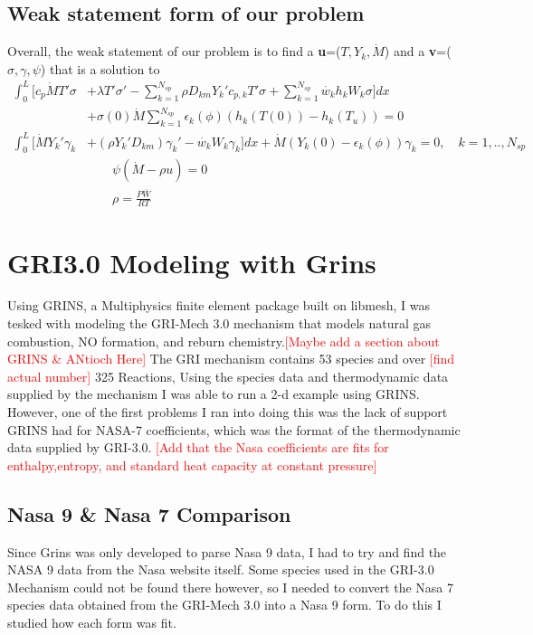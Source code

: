 \documentclass{article}
\newcommand\tab[1][1cm]{\hspace*{#1}}
\newcommand{\red}[1]{\textcolor{red}{[#1]}} %
\begin{document}
\subsection{Weak statement form of our problem}
  Overall, the weak statement of our problem is to find a \textbf{u}=($T,Y_{k},\dot{M}$) and a \textbf{v}=($\sigma,\gamma,\psi$) that is a solution to
  \begin{align*}
    \int_{0}^{L}[c_{p}\dot{M}T'\sigma&+\lambda T'\sigma '-\sum_{k=1}^{N_{sp}}\rho D_{km}Y_{k}'c_{p,k}T'\sigma+\sum_{k=1}^{N_{sp}}\dot{w_{k}}h_{k}W_{k}\sigma ]dx  \\
    &+ \sigma(0)\dot{M}\sum_{k=1}^{N_{sp}}\epsilon _{k}(\phi)(h_{k}(T(0))-h_{k}(T_{u})) = 0 \\
    \int_{0}^{L}[\dot{M}Y_{k}'\gamma_{k}&+(\rho Y_{k}'D_{km})\gamma_{k}'-\dot{w_{k}}W_{k}\gamma_{k}]dx + \dot{M}(Y_{k}(0)-\epsilon_{k}(\phi))\gamma_{k} = 0,\quad k=1,..,N_{sp} \\
   &\qquad \psi(\dot{M}-\rho u) = 0 \\
    &\qquad\rho = \frac{P\bar{W}}{RT} 
    \end{align*}






\newpage
\section{GRI3.0 Modeling with Grins}
\tab Using GRINS, a Multiphysics finite element package built on libmesh, I was tesked with modeling the GRI-Mech 3.0 mechanism that models natural gas combustion, NO formation, and reburn chemistry.\red{Maybe add a section about GRINS \& ANtioch Here} The GRI mechanism contains 53 species and over \red{find actual number} 325 Reactions, Using the species data and thermodynamic data supplied by the mechanism I was able to run a 2-d example using GRINS. However, one of the first problems I ran into doing this was the lack of support GRINS had for NASA-7 coefficients, which was the format of the thermodynamic data supplied by GRI-3.0.
\red{Add that the Nasa coefficients are fits for enthalpy,entropy, and standard heat capacity at constant pressure}
\subsection{Nasa 9 \& Nasa 7 Comparison}
\tab  Since Grins was only developed to parse Nasa 9 data, I had to try and find the NASA 9 data from the Nasa website itself. Some species used in the GRI-3.0 Mechanism could not be found there however, so I needed to convert the Nasa 7 species data obtained from the GRI-Mech 3.0 into a Nasa 9 form. To do this I studied how each form was fit.
\end{document}
